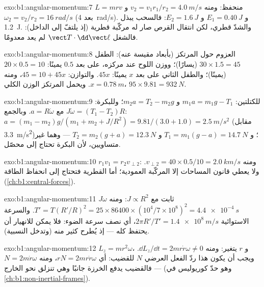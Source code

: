 \begin{solution}{exo:b1:angular-momentum:7}
$L = mrv$ منحفظ: ومنه $v_2 = v_1r_1/r_2 = \qty{4.0}{m/s}$ و $\omega_2 = v_2/r_2
= \qty{16}{rad/s}$ (بعد \qty{4}{rad/s}). و $E_1 = \qty{0.40}{J}$ و $E_2 =
\qty{1.6}{J}$: فالسحب يبذل \qty{1.2}{J}. والشدّ قطري، لكن
انتقال القرص صار له مركّبة قطرية (إذ يلتفّ إلى الداخل): فالشغل
$\vect T\cdot\dd\vect\ell$ لم يعد معدومًا.
\end{solution}

\begin{solution}{exo:b1:angular-momentum:8}
العزوم حول المرتكز (بأبعاد مقيسة عنه): الطفل $30 \times 1.5 =
45$ (يسارًا)؛ ووزن اللوح عند مركزه، على بعد $0.5$ يمينًا: $20 \times
0.5 = 10$ (يمينًا)؛ والطفل الثاني على بعد $x$ يمينًا: $45x$. والتوازن:
$45 = 10 + 45x$، ومنه $x = \qty{0.78}{m}$. ويحمل المرتكز الوزن الكلي،
$95 \times 9.81 = \qty{932}{N}$.
\end{solution}

\begin{solution}{exo:b1:angular-momentum:9}
للكتلتين: $m_1a = m_1g - T_1$ و $m_2a = T_2 - m_2g$؛ وللبكرة: $J\dot\omega =
(T_1 - T_2)R$ مع $a = R\dot\omega$. وبالجمع: $a = (m_1 - m_2)g/(m_1 + m_2 +
J/R^2) = 9.81/(3.0 + 1.0) = \qty{2.5}{m/s^2}$ (مقابل \qty{3.3}{m/s^2})؛
و $T_1 = m_1(g - a) = \qty{14.7}{N}$ و $T_2 = m_2(g + a) = \qty{12.3}{N}$ ---
وهما غير متساويين، لأن البكرة تحتاج إلى  محصّل.
\end{solution}

\begin{solution}{exo:b1:angular-momentum:10}
$r_1v_1 = r_2v_{\perp 2}$: ومنه $v_{\perp 2} = 40 \times 0.5/10 = \qty{2.0}{km/s}$.
ولا يعطي قانون المساحات إلا المركّبة العمودية؛ أما القطرية
فتحتاج إلى انحفاظ الطاقة (\cref{ch:b1:central-forces}).
\end{solution}

\begin{solution}{exo:b1:angular-momentum:11}
$J\omega$ ثابت مع $J \propto R^2$: ومنه $T' = T(R'/R)^2 = 25 \times 86400
\times (10^4/7\times10^8)^2 = \qty{4.4e-4}{s}$. والسرعة الاستوائية $2\pi R'/T'
= \qty{1.4e8}{m/s}$، أي نصف سرعة الضوء: فلا يمكن للانهيار أن يحتفظ
 كله --- إذ يُطرح كثير منه (وتدخل النسبية).
\end{solution}

\begin{solution}{exo:b1:angular-momentum:12}
$L_z = mr^2\omega$، و $r$ يتغير: ومنه $\dd L_z/\dd t = 2mr\dot r\omega \neq 0$.
ويجب أن يكون هذا  ردّ الفعل العرضي $N$ للقضيب: أي $rN =
2mr\dot r\omega$، ومنه $N = 2m\dot r\omega$ --- فالقضيب يدفع الخرزة جانبًا
وهي تنزلق نحو الخارج (وهو حدّ كوريوليس في \cref{ch:b1:non-inertial-frames}).
\end{solution}

